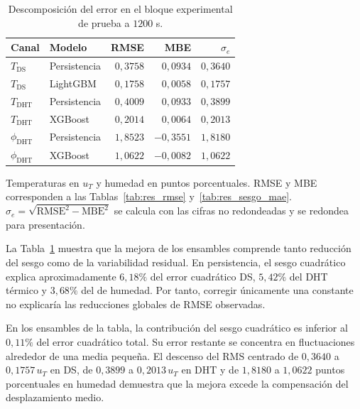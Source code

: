 \begin{table}[htbp]
\centering
\small
\caption{Descomposición del error en el bloque experimental de prueba a $1200$ s.}
\label{tab:dis_descomposicion_error}
\setlength{\tabcolsep}{5pt}
\begin{tabular}{llrrr}
\toprule
Canal & Modelo & RMSE & MBE & $\sigma_e$ \\
\midrule
$T_{\mathrm{DS}}$ & Persistencia & $0{,}3758$ & $0{,}0934$ & $0{,}3640$ \\
$T_{\mathrm{DS}}$ & LightGBM & $0{,}1758$ & $0{,}0058$ & $0{,}1757$ \\
$T_{\mathrm{DHT}}$ & Persistencia & $0{,}4009$ & $0{,}0933$ & $0{,}3899$ \\
$T_{\mathrm{DHT}}$ & XGBoost & $0{,}2014$ & $0{,}0064$ & $0{,}2013$ \\
$\phi_{\mathrm{DHT}}$ & Persistencia & $1{,}8523$ & $-0{,}3551$ & $1{,}8180$ \\
$\phi_{\mathrm{DHT}}$ & XGBoost & $1{,}0622$ & $-0{,}0082$ & $1{,}0622$ \\
\bottomrule
\end{tabular}
\par\vspace{3pt}
\begin{minipage}{0.98\textwidth}\footnotesize
Temperaturas en $u_T$ y humedad en puntos porcentuales. RMSE y MBE corresponden a las Tablas~\ref{tab:res_rmse} y~\ref{tab:res_sesgo_mae}. $\sigma_e=\sqrt{\mathrm{RMSE}^2-\mathrm{MBE}^2}$ se calcula con las cifras no redondeadas y se redondea para presentación.
\end{minipage}
\end{table}

La Tabla~\ref{tab:dis_descomposicion_error} muestra que la mejora de los ensambles comprende tanto reducción del sesgo como de la variabilidad residual. En persistencia, el sesgo cuadrático explica aproximadamente $6{,}18\%$ del error cuadrático DS, $5{,}42\%$ del DHT térmico y $3{,}68\%$ del de humedad. Por tanto, corregir únicamente una constante no explicaría las reducciones globales de RMSE observadas.

En los ensambles de la tabla, la contribución del sesgo cuadrático es inferior al $0{,}11\%$ del error cuadrático total. Su error restante se concentra en fluctuaciones alrededor de una media pequeña. El descenso del RMS centrado de $0{,}3640$ a $0{,}1757\,u_T$ en DS, de $0{,}3899$ a $0{,}2013\,u_T$ en DHT y de $1{,}8180$ a $1{,}0622$ puntos porcentuales en humedad demuestra que la mejora excede la compensación del desplazamiento medio.

